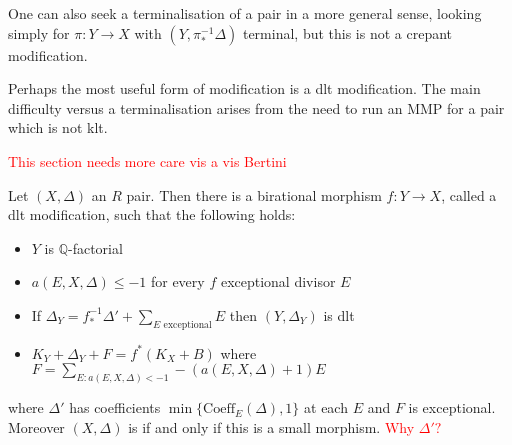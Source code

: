 \documentclass[a4paper,12pt]{book}
\newcommand\myworries[1]{\textcolor{red}{#1}}
\begin{document}
\begin{remark}
	
	One can also seek a terminalisation of a pair in a more general sense, looking simply for $\pi:Y \to X$ with $(Y,\pi_{*}^{-1}\Delta)$ terminal, but this is not a crepant modification.
	
	\end{remark}


Perhaps the most useful form of modification is a dlt modification. The main difficulty versus a terminalisation arises from the need to run an MMP for a pair which is not klt.

\myworries{This section needs more care vis a vis Bertini}

\begin{theorem}
	Let $(X,\Delta)$ an $R$ pair. Then there is a birational morphism $f:Y \to X$, called a dlt modification, such that the following holds:
	\begin{itemize}
		\item $Y$ is $\mathbb{Q}$-factorial
		\item $a(E,X,\Delta) \leq -1$ for every $f$ exceptional divisor $E$
		\item If $\Delta_{Y}=f^{-1}_{*}\Delta' + \sum_{E \text{ exceptional}} E$ then $(Y,\Delta_{Y})$ is dlt
		\item $K_{Y}+\Delta_{Y}+F=f^{*}(K_{X}+B)$ where $F= \sum_{E:a(E,X,\Delta)<-1} -(a(E,X,\Delta)+1)E$
	\end{itemize}
	where $\Delta'$ has coefficients $\min\{\text{Coeff}_{E}(\Delta),1\}$ at each $E$ and $F$ is exceptional. Moreover $(X,\Delta)$ is if and only if this is a small morphism.
	\myworries{Why $\Delta'?$}
\end{theorem}
\end{document}
